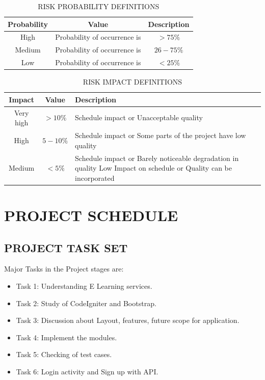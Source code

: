 \documentclass[oneside,a4paper,12pt]{report}
\begin{document}
\begin{table}[!htbp]
\begin{center}
\def\arraystretch{1.5}
\begin{tabular}{| c | c | c |}
\hline
Probability & Value &	Description \\ \hline
High &	Probability of occurrence is &  $ > 75 \% $ \\ \hline
Medium &	Probability of occurrence is  & $26-75 \% $ \\ \hline
Low	& Probability of occurrence is & $ < 25 \% $ \\ \hline
\end{tabular}
\end{center}
\caption{RISK PROBABILITY DEFINITIONS}
\label{tab:riskdef}
\end{table}

\begin{table}[!htbp]
\begin{center}
\def\arraystretch{1.5}
\begin{tabularx}{\textwidth}{| c | c | X |}
\hline
Impact & Value	& Description \\ \hline
Very high &	$> 10 \%$ & Schedule impact or Unacceptable quality \\ \hline
High &	$5-10 \%$ & Schedule impact or Some parts of the project have low quality \\ \hline
Medium	& $ < 5 \% $ & Schedule impact or Barely noticeable degradation in quality Low	Impact on schedule or Quality can be incorporated \\ \hline
\end{tabularx}
\end{center}
\caption{RISK IMPACT DEFINITIONS}
\label{tab:riskImpactDef}
\end{table}

\newpage
\section{PROJECT SCHEDULE}
\subsection{PROJECT TASK SET}
Major Tasks in the Project stages are:
\begin{itemize}
\item Task 1: Understanding E Learning services.
\item Task 2: Study of CodeIgniter and Bootstrap.
\item Task 3: Discussion about Layout, features, future scope for application.
\item Task 4: Implement the modules.
\item Task 5: Checking of test cases.
\item Task 6: Login activity and Sign up with API.
\end{itemize}
\newpage
\end{document}
